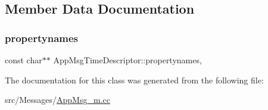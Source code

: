 \subsection{Member Data Documentation}
\mbox{\label{classAppMsgTimeDescriptor_a102cbf09a1ba7e40df81cca8c3c503b4}} 
\subsubsection{\texorpdfstring{propertynames}{propertynames}}
{\footnotesize\ttfamily const char$\ast$$\ast$ App\+Msg\+Time\+Descriptor\+::propertynames\hspace{0.3cm}{\ttfamily [mutable]}, {\ttfamily [private]}}



The documentation for this class was generated from the following file\+:\begin{DoxyCompactItemize}
\item 
src/\+Messages/\hyperlink{AppMsg__m_8cc}{App\+Msg\+\_\+m.\+cc}\end{DoxyCompactItemize}
